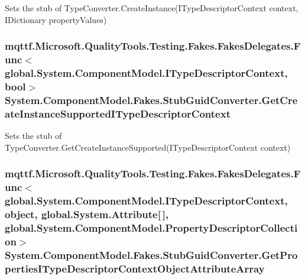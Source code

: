 Sets the stub of Type\-Converter.\-Create\-Instance(\-I\-Type\-Descriptor\-Context context, I\-Dictionary property\-Values)

\hypertarget{class_system_1_1_component_model_1_1_fakes_1_1_stub_guid_converter_aeb5c12af0711a267f758b3aa413545f1}{
\subsubsection[{Get\-Create\-Instance\-Supported\-I\-Type\-Descriptor\-Context}]{\setlength{\rightskip}{0pt plus 5cm}mqttf.\-Microsoft.\-Quality\-Tools.\-Testing.\-Fakes.\-Fakes\-Delegates.\-Func$<$global.\-System.\-Component\-Model.\-I\-Type\-Descriptor\-Context, bool$>$ System.\-Component\-Model.\-Fakes.\-Stub\-Guid\-Converter.\-Get\-Create\-Instance\-Supported\-I\-Type\-Descriptor\-Context}}\label{class_system_1_1_component_model_1_1_fakes_1_1_stub_guid_converter_aeb5c12af0711a267f758b3aa413545f1}


Sets the stub of Type\-Converter.\-Get\-Create\-Instance\-Supported(\-I\-Type\-Descriptor\-Context context)

\hypertarget{class_system_1_1_component_model_1_1_fakes_1_1_stub_guid_converter_a8549356b7482bd0eb6f8c4cad1b0f22d}{
\subsubsection[{Get\-Properties\-I\-Type\-Descriptor\-Context\-Object\-Attribute\-Array}]{\setlength{\rightskip}{0pt plus 5cm}mqttf.\-Microsoft.\-Quality\-Tools.\-Testing.\-Fakes.\-Fakes\-Delegates.\-Func$<$global.\-System.\-Component\-Model.\-I\-Type\-Descriptor\-Context, object, global.\-System.\-Attribute\mbox{[}$\,$\mbox{]}, global.\-System.\-Component\-Model.\-Property\-Descriptor\-Collection$>$ System.\-Component\-Model.\-Fakes.\-Stub\-Guid\-Converter.\-Get\-Properties\-I\-Type\-Descriptor\-Context\-Object\-Attribute\-Array}}\label{class_system_1_1_component_model_1_1_fakes_1_1_stub_guid_converter_a8549356b7482bd0eb6f8c4cad1b0f22d}


